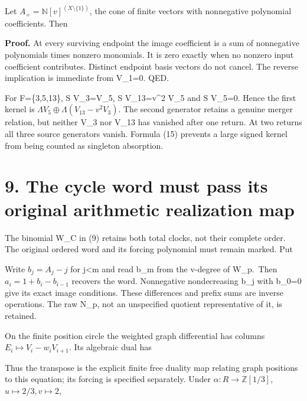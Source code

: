 Let \(A_+=\mathbb N[v]^{(X\setminus\{1\})}\), the cone of finite vectors
with nonnegative polynomial coefficients. Then


\textbf{Proof.} At every surviving endpoint the image coefficient is a
sum of nonnegative polynomials times nonzero monomials. It is zero
exactly when no nonzero input coefficient contributes. Distinct endpoint
basis vectors do not cancel. The reverse implication is immediate from
V\_1=0. QED.

For F=\{3,5,13\}, S V\_3=V\_5, S V\_13=v\^{}2 V\_5 and S V\_5=0. Hence
the first kernel is \(\Lambda V_5\oplus\Lambda(V_{13}-v^2V_3)\). The
second generator retains a genuine merger relation, but neither V\_3 nor
V\_13 has vanished after one return. At two returns all three source
generators vanish. Formula (15) prevents a large signed kernel from
being counted as singleton absorption.

\section{9. The cycle word must pass its original arithmetic realization
map}

The binomial W\_C in (9) retains both total clocks, not their complete
order. The original ordered word and its forcing polynomial must remain
marked. Put


Write \(b_j=A_j-j\) for j\textless m and read b\_m from the v-degree of
W\_p.~Then \(a_i=1+b_i-b_{i-1}\) recovers the word. Nonnegative
nondecreasing b\_j with b\_0=0 give its exact image conditions. These
differences and prefix sums are inverse operations. The raw N\_p, not an
unspecified quotient representative of it, is retained.

On the finite position circle the weighted graph differential has
columns \(E_i\mapsto V_i-w_iV_{i+1}\). Its algebraic dual has


Thus the transpose is the explicit finite free duality map relating
graph positions to this equation; its forcing is specified separately.
Under \(\alpha:R\to\mathbb Z[1/3]\), \(u\mapsto2/3,v\mapsto2\),


